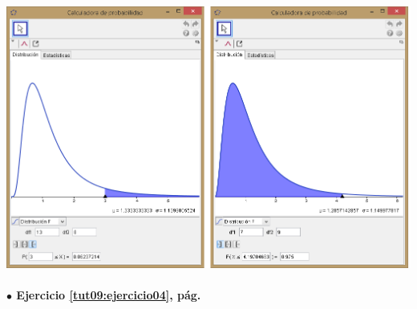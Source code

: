 \documentclass[10pt,a4paper]{article}\usepackage[]{graphicx}\usepackage[]{color}
\begin{document}
{    \begin{center}
    \includegraphics[width=16cm]{../fig/Tut09-12.png}
    \end{center}

\paragraph{\bf $\bullet$ Ejercicio \ref{tut09:ejercicio04}, pág. \pageref{tut09:ejercicio04}}
\label{tut09:ejercicio04:sol}\quad\\

}
\end{document}
